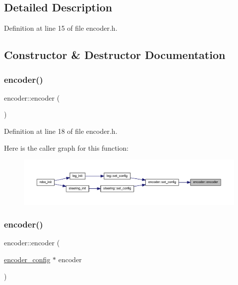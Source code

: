 \subsection{Detailed Description}


Definition at line 15 of file encoder.\+h.



\subsection{Constructor \& Destructor Documentation}
\mbox{\label{classencoder_af19dfa89c07692c0b1da8f24aec3d52d}} 
\subsubsection{\texorpdfstring{encoder()}{encoder()}\hspace{0.1cm}{\footnotesize\ttfamily [1/4]}}
{\footnotesize\ttfamily encoder\+::encoder (\begin{DoxyParamCaption}{ }\end{DoxyParamCaption})\hspace{0.3cm}{\ttfamily [inline]}}



Definition at line 18 of file encoder.\+h.

Here is the caller graph for this function\+:
\nopagebreak
\begin{figure}[H]
\begin{center}
\leavevmode
\includegraphics[width=350pt]{classencoder_af19dfa89c07692c0b1da8f24aec3d52d_icgraph}
\end{center}
\end{figure}
\mbox{\label{classencoder_a074f819c70398da9ce1af632dc391a19}} 
\subsubsection{\texorpdfstring{encoder()}{encoder()}\hspace{0.1cm}{\footnotesize\ttfamily [2/4]}}
{\footnotesize\ttfamily encoder\+::encoder (\begin{DoxyParamCaption}\item[{\mbox{\hyperlink{structencoder__config}{encoder\+\_\+config}} $\ast$}]{encoder }\end{DoxyParamCaption})\hspace{0.3cm}{\ttfamily [inline]}}



